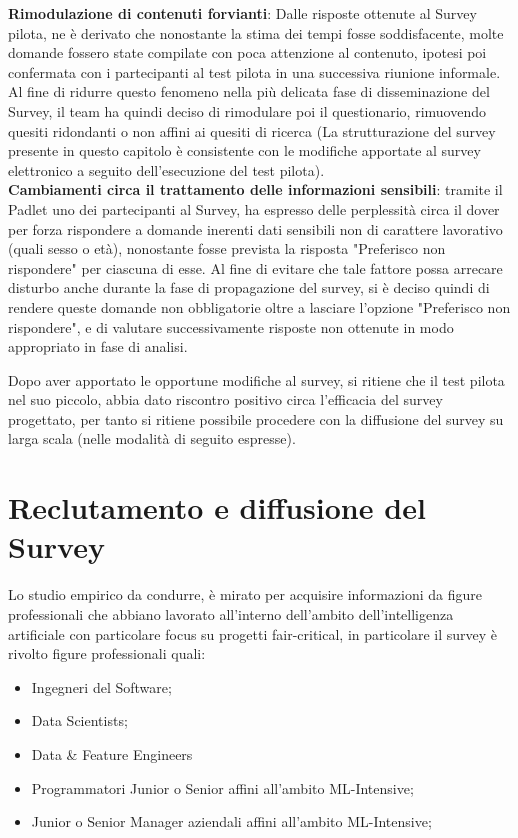    \textbf{Rimodulazione di contenuti forvianti}:
   Dalle risposte ottenute al Survey pilota, ne è derivato che nonostante la stima dei tempi fosse soddisfacente, molte domande fossero state compilate con poca attenzione al contenuto, ipotesi poi confermata con i partecipanti al test pilota in una successiva riunione informale. Al fine di ridurre questo fenomeno nella più delicata fase di disseminazione del Survey, il team ha quindi deciso di rimodulare poi il questionario, rimuovendo quesiti ridondanti o non affini ai quesiti di ricerca (La strutturazione del survey presente in questo capitolo è consistente con le modifiche apportate al survey elettronico a seguito dell'esecuzione del test pilota). \\
   
   \textbf{Cambiamenti circa il trattamento delle informazioni sensibili}: 
   tramite il Padlet uno dei partecipanti al Survey, ha espresso delle perplessità circa il dover per forza rispondere a domande inerenti dati sensibili non di carattere lavorativo (quali sesso o età), nonostante fosse prevista la risposta "Preferisco non rispondere" per ciascuna di esse.  Al fine di evitare che tale fattore possa arrecare disturbo anche durante la fase di propagazione del survey, si è deciso quindi di rendere queste domande non obbligatorie oltre a lasciare l'opzione "Preferisco non rispondere", e di valutare successivamente risposte non ottenute in modo appropriato in fase di analisi. 
   
   Dopo aver apportato le opportune modifiche al survey, si ritiene che il test pilota nel suo piccolo, abbia dato riscontro positivo circa l'efficacia del survey progettato, per tanto si ritiene possibile procedere con la diffusione del survey su larga scala (nelle modalità di seguito espresse).
    
    
    
    \section{Reclutamento e diffusione del Survey}
    
    Lo studio empirico da condurre, è mirato per acquisire informazioni da figure professionali che abbiano lavorato all'interno dell'ambito dell'intelligenza artificiale con particolare focus su progetti fair-critical, in particolare il survey è rivolto figure professionali quali:
    
        \begin{itemize}
            \item Ingegneri del Software;
            \item Data Scientists;
            \item Data \& Feature Engineers
            \item Programmatori Junior o Senior affini all'ambito ML-Intensive;
            \item Junior o Senior Manager aziendali affini all'ambito ML-Intensive;
        \end{itemize}
        
